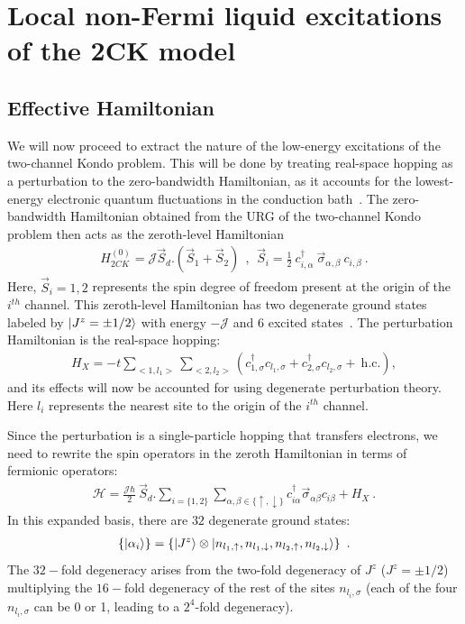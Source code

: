 \documentclass{iopart}
\begin{document}
\section{Local non-Fermi liquid excitations of the 2CK model}
\label{sec:excitations}

\subsection{Effective Hamiltonian}
\label{sec:eff_ham_2ch}

We will now proceed to extract the nature of the low-energy excitations of the two-channel Kondo problem. This will be done by treating real-space hopping as a perturbation to the zero-bandwidth Hamiltonian, as it accounts for the lowest-energy electronic quantum fluctuations in the conduction bath~\cite{nozieres1974fermi}. The zero-bandwidth Hamiltonian obtained from the URG of the two-channel Kondo problem then acts as the zeroth-level Hamiltonian
\begin{eqnarray}
H^{(0)}_{2CK}= {\mathcal{J}} \vec{S}_d.(\vec{S}_1+\vec{S}_2)~~,~~\vec{S}_i =  \frac{1}{2}~ c_{i,\alpha}^{\dagger}~ \vec{\sigma}_{\alpha,\beta}~ c_{i,\beta}~.
\label{eq:channel-2-spin}
\end{eqnarray}
Here, $\vec{S}_i=1,2$ represents the spin degree of freedom present at the origin of the $i^{th}$ channel. This zeroth-level Hamiltonian has two degenerate ground states labeled by $\ket{J^z=\pm 1/2}$ with energy $-\mathcal{J}$ and $6$ excited states~\cite{kunj_slal_1999}.
The perturbation Hamiltonian is the real-space hopping:
\begin{eqnarray}
H_{X} = -t \displaystyle\sum_{<1,l_1>}\sum_{<2,l_2>} (c^{\dagger}_{1,\sigma}c_{l_1,\sigma}+c^{\dagger}_{2,\sigma}c_{l_2,\sigma}+ ~\textrm{h.c.}),
\end{eqnarray}
and its effects will now be accounted for using degenerate perturbation theory. Here $l_i$ represents the nearest site to the origin of the $i^{th}$ channel.

Since the perturbation is a single-particle hopping that transfers electrons, we need to rewrite the spin operators in the zeroth Hamiltonian in terms of fermionic operators:
\begin{eqnarray}
\mathcal{H} = \frac{{\mathcal{J}}\hbar}{2}~ \vec{S}_d. \displaystyle\sum_{i=\{1,2\}} \displaystyle\sum_{\alpha,\beta\in\{\uparrow,\downarrow\}}c_{i\alpha}^{\dagger} \vec{\sigma}_{\alpha\beta} c_{i\beta} + H_X~.
\label{eq:excitation_hamiltonian}
\end{eqnarray}
In this expanded basis, there are $32$ degenerate ground states:
\begin{eqnarray}
\label{gstate-set}
\left\{ \ket{\alpha_i} \right\} = \left\{ \ket{J^z}\otimes\ket{n_{l_1,\uparrow},n_{l_1,\downarrow},n_{l_2,\uparrow},n_{l_2,\downarrow}} \right\}~.
\end{eqnarray}
The \(32-\)fold degeneracy arises from the two-fold degeneracy of \(J^z\) (\(J^z = \pm 1/2\)) multiplying the \(16-\)fold degeneracy of the rest of the sites \(n_{l_i,\sigma}\) (each of the four \(n_{l_i,\sigma}\) can be 0 or 1, leading to a \(2^4\)-fold degeneracy).
\end{document}
